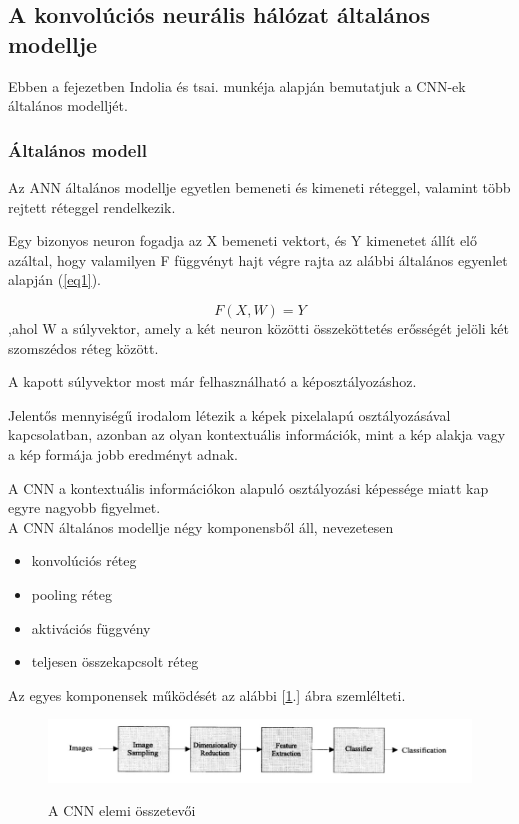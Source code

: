 \documentclass[12pt,a4]{article}
\begin{document}
	\subsection{A konvolúciós neurális hálózat általános modellje}
    Ebben a fejezetben Indolia és tsai. \cite{CNN} munkéja alapján bemutatjuk a CNN-ek általános modelljét.
 
	\subsubsection{Általános modell}
	Az ANN általános modellje egyetlen bemeneti és kimeneti réteggel,
	valamint több rejtett réteggel rendelkezik.
	
	Egy bizonyos 
	neuron fogadja az X bemeneti vektort, és Y kimenetet állít elő azáltal,
	hogy valamilyen F függvényt hajt végre rajta az alábbi általános egyenlet alapján (\ref{eq1}).
	\begin{mdframed}
	\begin{equation}
    \label{eq1}
			F(X, W) = Y
	\end{equation}
	,ahol W a súlyvektor, amely a két neuron közötti összeköttetés erősségét jelöli két szomszédos réteg között.
 	\end{mdframed}

	A kapott súlyvektor most már felhasználható a képosztályozáshoz.
	
	Jelentős mennyiségű irodalom létezik a képek pixelalapú osztályozásával
	kapcsolatban, azonban az olyan kontextuális információk, mint a kép alakja vagy 
	a kép formája jobb eredményt adnak.
	
	A CNN a kontextuális információkon alapuló osztályozási képessége miatt kap egyre nagyobb figyelmet.\\
	
	
	A CNN általános modellje négy komponensből áll, nevezetesen 
	\begin{itemize}
		\item konvolúciós réteg
		\item pooling réteg
		\item aktivációs függvény
		\item teljesen összekapcsolt réteg
	\end{itemize}
	Az egyes komponensek működését az alábbi [\ref{fig:cnnelem}.] ábra szemlélteti.
	
	\begin{figure}[h]	
		\centering
		\includegraphics[width=1\linewidth]{element}
        \label{fig:cnnelem}
		\caption{\cite{CNN} A CNN elemi összetevői}
	\end{figure}
\end{document}

